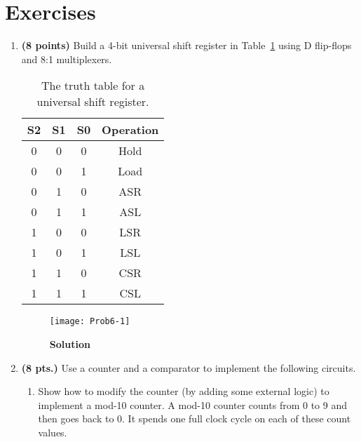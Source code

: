 \section{Exercises}
\label{section:sequentialBB}
\graphicspath{ {./chapter06/FigHw} }

\begin{enumerate}
    \item \textbf{ (8 points)} Build a 4-bit universal shift register in
        Table~\ref{table:uni} using D flip-flops and 8:1 multiplexers.

        \begin{table}[h]
            \centering
            \begin{tabular}{c|c|c||c}
                S2 & S1 & S0 & Operation \\ \hline
                0  &  0 &  0 & Hold \\ \hline
                0  &  0 &  1 & Load \\ \hline
                0  &  1 &  0 & ASR  \\ \hline
                0  &  1 &  1 & ASL  \\ \hline
                1  &  0 &  0 & LSR  \\ \hline
                1  &  0 &  1 & LSL  \\ \hline
                1  &  1 &  0 & CSR  \\ \hline
                1  &  1 &  1 & CSL  \\
            \end{tabular}
            \caption{The truth table for a universal shift register.}
            \label{table:uni}
        \end{table}

        \begin{onlysolution}
            \begin{figure}[ht]
                \caption{\textbf{Solution}}
                \texttt{[image: Prob6-1]}
            \end{figure}
        \end{onlysolution}

    \item \textbf{ (8 pts.)} Use a counter and a comparator
        to implement the following circuits.

        \begin{enumerate}
            \item Show how to modify the counter (by adding some external logic)
                to implement a mod-10 counter.  A mod-10 counter counts from 0 to
                9 and then goes back to 0.  It spends one full clock cycle on each
                of these count values.


\end{enumerate}
\end{enumerate}
